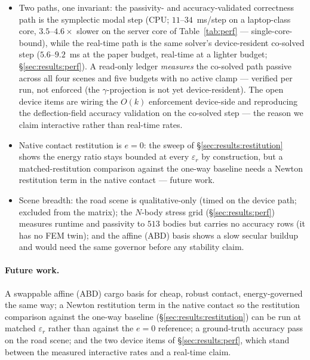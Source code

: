 \begin{itemize}
  \item Two paths, one invariant: the passivity- and accuracy-validated
        correctness path is the symplectic modal step (CPU; $11$--$34$~ms/step
        on a laptop-class core, $3.5$--$4.6\times$ slower on the server core
        of Table~\ref{tab:perf} --- single-core-bound), while the real-time
        path is the same solver's
        device-resident co-solved step ($5.6$--$9.2$~ms at the paper budget,
        real-time at a lighter budget; \S\ref{sec:results:perf}). A read-only
        ledger \emph{measures} the co-solved path passive across all four
        scenes and five budgets with no active clamp --- verified per run,
        not enforced (the $\gamma$-projection is not yet device-resident).
        The open device items are wiring the $O(k)$ enforcement device-side
        and reproducing the deflection-field accuracy validation on the
        co-solved step --- the reason we claim interactive rather than
        real-time rates.
  \item Native contact restitution is $e{=}0$: the sweep of
        \S\ref{sec:results:restitution} shows the energy ratio stays bounded at
        every $\varepsilon_r$ by construction, but a matched-restitution
        comparison against the one-way baseline needs a Newton restitution
        term in the native contact --- future work.
  \item Scene breadth: the road scene is qualitative-only (timed on the
        device path; excluded from the matrix); the $N$-body stress grid
        (\S\ref{sec:results:perf}) measures runtime and passivity to $513$
        bodies but carries no accuracy rows (it has no FEM twin); and the
        affine (ABD) basis shows a slow secular buildup and would need the
        same governor before any stability claim.
\end{itemize}

\paragraph*{Future work.} A swappable affine (ABD) cargo basis for cheap, robust
contact, energy-governed the same way; a Newton restitution term in the native
contact so the restitution comparison against the one-way baseline
(\S\ref{sec:results:restitution}) can be run at matched $\varepsilon_r$ rather
than against the $e{=}0$ reference; a ground-truth accuracy pass on the road
scene; and the two device items of \S\ref{sec:results:perf}, which stand
between the measured interactive rates and a real-time claim.
